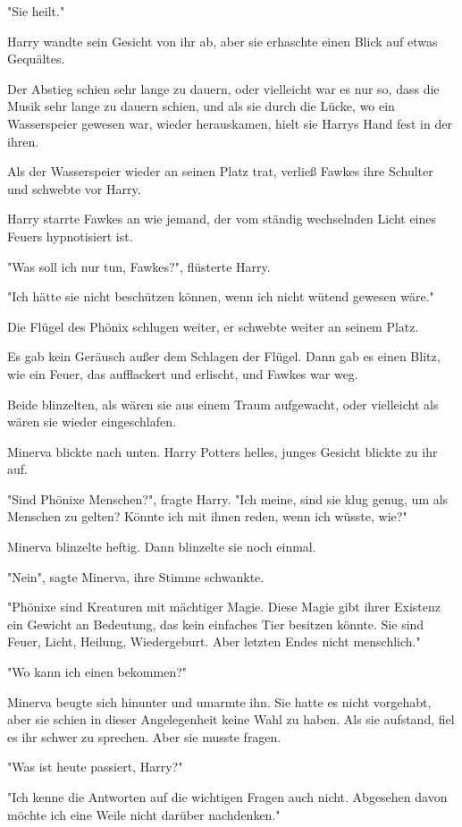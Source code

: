 {"Sie heilt."

Harry wandte sein Gesicht von ihr ab, aber sie erhaschte einen Blick auf etwas Gequältes.

Der Abstieg schien sehr lange zu dauern, oder vielleicht war es nur so, dass die Musik sehr lange zu dauern schien, und als sie durch die Lücke, wo ein Wasserspeier gewesen war, wieder herauskamen, hielt sie Harrys Hand fest in der ihren.

Als der Wasserspeier wieder an seinen Platz trat, verließ Fawkes ihre Schulter und schwebte vor Harry.

Harry starrte Fawkes an wie jemand, der vom ständig wechselnden Licht eines Feuers hypnotisiert ist.

"Was soll ich nur tun, Fawkes?", flüsterte Harry.

"Ich hätte sie nicht beschützen können, wenn ich nicht wütend gewesen wäre."

Die Flügel des Phönix schlugen weiter, er schwebte weiter an seinem Platz.

Es gab kein Geräusch außer dem Schlagen der Flügel. Dann gab es einen Blitz, wie ein Feuer, das aufflackert und erlischt, und Fawkes war weg.

Beide blinzelten, als wären sie aus einem Traum aufgewacht, oder vielleicht als wären sie wieder eingeschlafen.

Minerva blickte nach unten. Harry Potters helles, junges Gesicht blickte zu ihr auf.

"Sind Phönixe Menschen?", fragte Harry. "Ich meine, sind sie klug genug, um als Menschen zu gelten? Könnte ich mit ihnen reden, wenn ich wüsste, wie?"

Minerva blinzelte heftig. Dann blinzelte sie noch einmal.

"Nein", sagte Minerva, ihre Stimme schwankte.

"Phönixe sind Kreaturen mit mächtiger Magie. Diese Magie gibt ihrer Existenz ein Gewicht an Bedeutung, das kein einfaches Tier besitzen könnte. Sie sind Feuer, Licht, Heilung, Wiedergeburt. Aber letzten Endes nicht menschlich."

"Wo kann ich einen bekommen?"

Minerva beugte sich hinunter und umarmte ihn. Sie hatte es nicht vorgehabt, aber sie schien in dieser Angelegenheit keine Wahl zu haben. Als sie aufstand, fiel es ihr schwer zu sprechen. Aber sie musste fragen.

"Was ist heute passiert, Harry?"

"Ich kenne die Antworten auf die wichtigen Fragen auch nicht. Abgesehen davon möchte ich eine Weile nicht darüber nachdenken."

}
